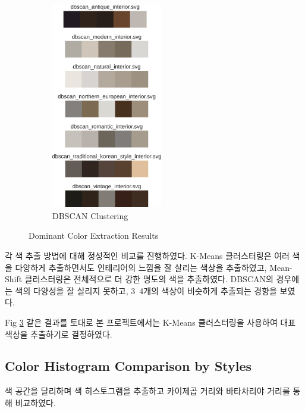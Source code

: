 \documentclass[11pt]{article}
\begin{document}
\begin{figure}[htbp]
\begin{subfigure}[b]{0.3\textwidth}
        \label{fig:meanshift}
    \end{subfigure}
    \begin{subfigure}[b]{0.3\textwidth}
        \centering
        \includegraphics[height=9cm]{figures/dbscan_dominant_color.pdf}
        \caption{DBSCAN Clustering}
        \label{fig:dbscan}
    \end{subfigure}
    \caption{Dominant Color Extraction Results}
    \label{fig:dominant_color_extraction}
\end{figure}

각 색 추출 방법에 대해 정성적인 비교를 진행하였다. K-Means 클러스터링은 여러 색을 다양하게 추출하면서도 인테리어의 느낌을 잘 살리는 색상을 추출하였고, Mean-Shift 클러스터링은 전체적으로 더 강한 명도의 색을 추출하였다.
DBSCAN의 경우에는 색의 다양성을 잘 살리지 못하고, 3~4개의 색상이 비슷하게 추출되는 경향을 보였다.

Fig \ref{fig:dominant_color_extraction} 같은 결과를 토대로 본 프로젝트에서는 K-Means 클러스터링을 사용하여 대표 색상을 추출하기로 결정하였다.
\subsection{Color Histogram Comparison by Styles}
색 공간을 달리하며 색 히스토그램을 추출하고 카이제곱 거리와 바타차리야 거리를 통해 비교하였다.
\end{document}
